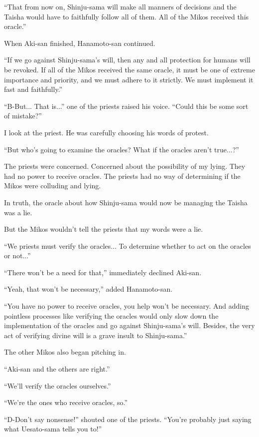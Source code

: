 ``That from now on, Shinju-sama will make all manners of decisions and the Taisha would have to faithfully follow all of them. All of the Mikos received this oracle.''

When Aki-san finished, Hanamoto-san continued.

``If we go against Shinju-sama's will, then any and all protection for humans will be revoked. If all of the Mikos received the same oracle, it must be one of extreme importance and priority, and we must adhere to it strictly. We must implement it fast and faithfully.''

``B-But... That is...'' one of the priests raised his voice.  ``Could this be some sort of mistake?''

I look at the priest. He was carefully choosing his words of protest.

``But who's going to examine the oracles? What if the oracles aren't true...?''

The priests were concerned. Concerned about the possibility of my lying. They had no power to receive oracles. The priests had no way of determining if the Mikos were colluding and lying.

In truth, the oracle about how Shinju-sama would now be managing the Taisha was a lie.

But the Mikos wouldn't tell the priests that my words were a lie.

``We priests must verify the oracles... To determine whether to act on the oracles or not...''

``There won't be a need for that,'' immediately declined Aki-san.

``Yeah, that won't be necessary,'' added Hanamoto-san.

``You have no power to receive oracles, you help won't be necessary. And adding pointless processes like verifying the oracles would only slow down the implementation of the oracles and go against Shinju-sama's will. Besides, the very act of verifying divine will is a grave insult to Shinju-sama.''

The other Mikos also began pitching in.

``Aki-san and the others are right.''

``We'll verify the oracles ourselves.''

``We're the ones who receive oracles, so.''

``D-Don't say nonsense!'' shouted one of the priests.  ``You're probably just saying what Uesato-sama tells you to!''

